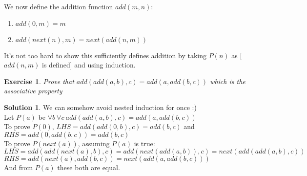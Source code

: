 \documentclass[a4paper,10pt]{article}
\newtheorem{exercise}{Exercise}[section]
\theoremstyle{definition} %
\newtheorem*{solution}{Solution}
\begin{document}
    We now define the addition function $add(m, n)$: 
    \begin{tcolorbox}[colback=blue!10!white, colframe=blue!50!black]
        \begin{enumerate}
            \item $add(0, m) = m$
            \item $add(next(n), m) = next(add(n, m))$
        \end{enumerate}
    \end{tcolorbox}
    It's not too hard to show this sufficiently defines addition by taking $P(n)$ as
    [$add(n, m)$ is defined] and using induction.

    \begin{exercise}
        Prove that $add(add(a,b), c) = add(a, add(b,c))$ which is the associative property
    \end{exercise}
    \begin{solution}
        We can somehow avoid nested induction for once :) \\
        Let $P(a)$ be $\forall b \ \forall c \ add(add(a,b), c) = add(a, add(b,c))$ \\
        To prove $P(0)$, $LHS = add(add(0,b), c) = add(b,c)$ and $RHS = add(0, add(b,c)) = add(b,c)$ \\
        To prove $P(next(a))$, assuming $P(a)$ is true: \\
        $LHS = add(add(next(a),b), c) = add(next(add(a,b)), c) = next(add(add(a,b), c))$ \\
        $RHS = add(next(a), add(b,c)) = next(add(a, add(b,c)))$ \\
        And from $P(a)$ these both are equal.
    \end{solution}
\end{document}
